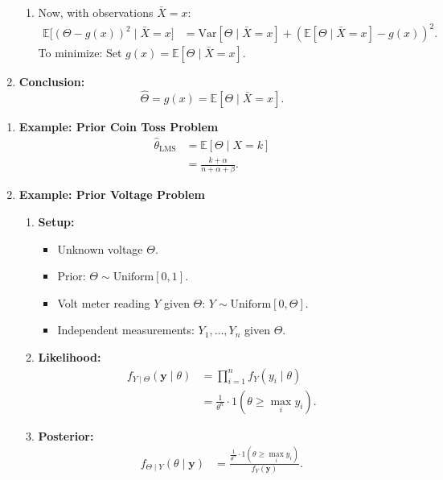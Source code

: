 \begin{enumerate}
\begin{enumerate}
        \item Now, with observations \( \bar{X} = x \):
        \begin{align*}
            \mathbb{E}\big[(\Theta - g(x))^2 \mid \bar{X} = x\big] &= \mathrm{Var}[\Theta \mid \bar{X} = x] + (\mathbb{E}[\Theta \mid \bar{X} = x] - g(x))^2.
        \end{align*}
        To minimize: Set \( g(x) = \mathbb{E}[\Theta \mid \bar{X} = x] \).
    \end{enumerate}

    \item \textbf{Conclusion:}
    \[
    \hat{\Theta} = g(x) = \mathbb{E}[\Theta \mid \bar{X} = x].
    \]
\end{enumerate}

\begin{enumerate}
    \item \textbf{Example: Prior Coin Toss Problem}
    \begin{align*}
        \hat{\theta}_{\text{LMS}} &= \mathbb{E}[\Theta \mid X = k] \\
        &= \frac{k + \alpha}{n + \alpha + \beta}.
    \end{align*}

    \item \textbf{Example: Prior Voltage Problem}
    \begin{enumerate}
        \item \textbf{Setup:}
        \begin{itemize}
            \item Unknown voltage \( \Theta \).
            \item Prior: \( \Theta \sim \text{Uniform}[0, 1] \).
            \item Volt meter reading \( Y \) given \( \Theta \): \( Y \sim \text{Uniform}[0, \Theta] \).
            \item Independent measurements: \( Y_1, \dots, Y_n \) given \( \Theta \).
        \end{itemize}

        \item \textbf{Likelihood:}
        \begin{align*}
            f_{Y \mid \Theta}(\mathbf{y} \mid \theta) &= \prod_{i=1}^n f_{Y}(y_i \mid \theta) \\
            &= \frac{1}{\theta^n} \cdot 1(\theta \geq \max_i y_i).
        \end{align*}

        \item \textbf{Posterior:}
        \begin{align*}
            f_{\Theta \mid Y}(\theta \mid \mathbf{y}) &= \frac{\frac{1}{\theta^n} \cdot 1(\theta \geq \max_i y_i)}{f_Y(\mathbf{y})}.
        \end{align*}


\end{enumerate}
\end{enumerate}

